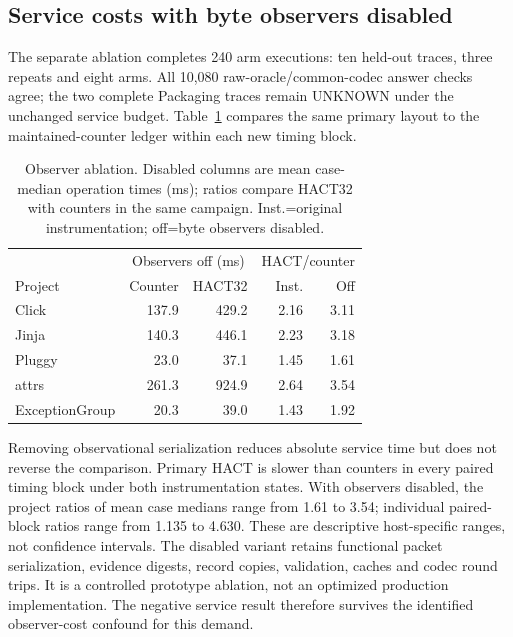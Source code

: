 \subsection{Service costs with byte observers disabled}
The separate ablation completes 240 arm executions: ten held-out traces,
three repeats and eight arms. All 10,080 raw-oracle/common-codec answer
checks agree; the two complete Packaging traces remain UNKNOWN under the
unchanged service budget. Table~\ref{tab:v12-observer} compares the same
primary layout to the maintained-counter ledger within each new timing block.

\begin{table}[t]\centering\footnotesize
\caption{Observer ablation. Disabled columns are mean case-median operation
times (ms); ratios compare HACT32 with counters in the same campaign.
Inst.=original instrumentation; off=byte observers disabled.}
\label{tab:v12-observer}
\begin{tabular}{@{}lrrrr@{}}\toprule
& \multicolumn{2}{c}{Observers off (ms)} & \multicolumn{2}{c}{HACT/counter}\\
Project & Counter & HACT32 & Inst. & Off\\\midrule
Click & 137.9 & 429.2 & 2.16 & 3.11 \\
Jinja & 140.3 & 446.1 & 2.23 & 3.18 \\
Pluggy & 23.0 & 37.1 & 1.45 & 1.61 \\
attrs & 261.3 & 924.9 & 2.64 & 3.54 \\
ExceptionGroup & 20.3 & 39.0 & 1.43 & 1.92 \\
\bottomrule\end{tabular}\end{table}

Removing observational serialization reduces absolute service time but
does not reverse the comparison. Primary HACT is slower than counters
in every paired timing block under both instrumentation states. With
observers disabled, the project ratios of mean case medians range from
1.61 to 3.54; individual paired-block ratios range from
1.135 to 4.630. These are descriptive host-specific
ranges, not confidence intervals. The disabled variant retains functional
packet serialization, evidence digests, record copies, validation, caches
and codec round trips. It is a controlled prototype ablation, not an optimized
production implementation. The negative service result therefore survives
the identified observer-cost confound for this demand.
